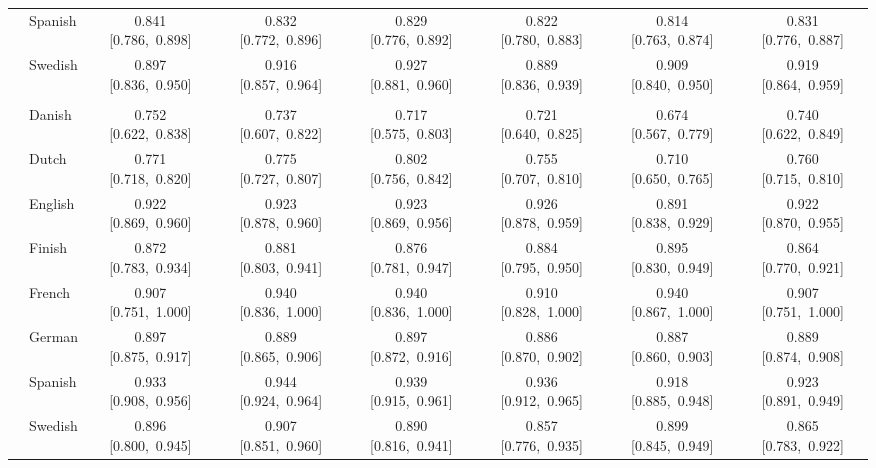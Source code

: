 \begin{longtable}[t]{llcccccc}
 & Spanish & 0.841 [0.786,~0.898] & 0.832 [0.772,~0.896] & 0.829 [0.776,~0.892] & 0.822 [0.780,~0.883] & 0.814 [0.763,~0.874] & 0.831 [0.776,~0.887]\\

 & Swedish & 0.897 [0.836,~0.950] & 0.916 [0.857,~0.964] & 0.927 [0.881,~0.960] & 0.889 [0.836,~0.939] & 0.909 [0.840,~0.950] & 0.919 [0.864,~0.959]\\

\addlinespace[3pt]
\multicolumn{8}{p{\linewidth}}{\cellcolor[HTML]{DCDCDC}{classify the stance expressed in quasi-sentences about the issues of immigration and integration \(binary)}}\\
\addlinespace & Danish & 0.752 [0.622,~0.838] & 0.737 [0.607,~0.822] & 0.717 [0.575,~0.803] & 0.721 [0.640,~0.825] & 0.674 [0.567,~0.779] & 0.740 [0.622,~0.849]\\

 & Dutch & 0.771 [0.718,~0.820] & 0.775 [0.727,~0.807] & 0.802 [0.756,~0.842] & 0.755 [0.707,~0.810] & 0.710 [0.650,~0.765] & 0.760 [0.715,~0.810]\\

 & English & 0.922 [0.869,~0.960] & 0.923 [0.878,~0.960] & 0.923 [0.869,~0.956] & 0.926 [0.878,~0.959] & 0.891 [0.838,~0.929] & 0.922 [0.870,~0.955]\\

 & Finish & 0.872 [0.783,~0.934] & 0.881 [0.803,~0.941] & 0.876 [0.781,~0.947] & 0.884 [0.795,~0.950] & 0.895 [0.830,~0.949] & 0.864 [0.770,~0.921]\\

 & French & 0.907 [0.751,~1.000] & 0.940 [0.836,~1.000] & 0.940 [0.836,~1.000] & 0.910 [0.828,~1.000] & 0.940 [0.867,~1.000] & 0.907 [0.751,~1.000]\\

 & German & 0.897 [0.875,~0.917] & 0.889 [0.865,~0.906] & 0.897 [0.872,~0.916] & 0.886 [0.870,~0.902] & 0.887 [0.860,~0.903] & 0.889 [0.874,~0.908]\\

 & Spanish & 0.933 [0.908,~0.956] & 0.944 [0.924,~0.964] & 0.939 [0.915,~0.961] & 0.936 [0.912,~0.965] & 0.918 [0.885,~0.948] & 0.923 [0.891,~0.949]\\

 & Swedish & 0.896 [0.800,~0.945] & 0.907 [0.851,~0.960] & 0.890 [0.816,~0.941] & 0.857 [0.776,~0.935] & 0.899 [0.845,~0.949] & 0.865 [0.783,~0.922]\\*
\end{longtable}
\endgroup{}
\endgroup{}
